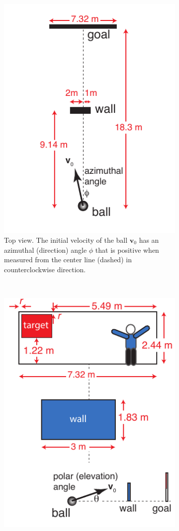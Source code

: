 \documentclass[letterpaper]{scrartcl}
\renewcommand{\vec}[1]{\ensuremath{\mathbf{#1}}}
\begin{document}
\begin{figure}
  \begin{subfigure}[b]{0.4\linewidth}
    \includegraphics{figs/freekick-top}
    \caption{Top view. The initial velocity of the ball $\vec{v}_{0}$
      has an azimuthal (direction) angle $\phi$ that is positive when
      measured from the center line (dashed) in counterclockwise
      direction.}
    \label{fig:freekicktop}
  \end{subfigure}
  ~
  \begin{subfigure}[b]{0.4\linewidth}
    \includegraphics{figs/freekick-side}

\end{subfigure}
\end{figure}
\end{document}
